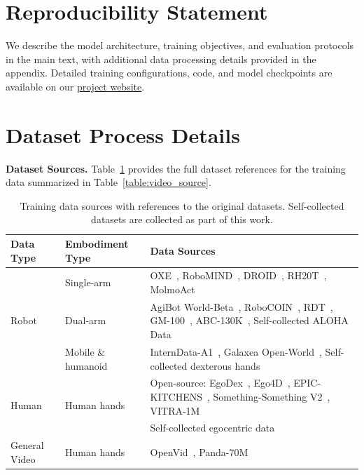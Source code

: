 \section*{Reproducibility Statement}
We describe the model architecture, training objectives, and evaluation protocols in the main text, with additional data processing details provided in the appendix. Detailed training configurations, code, and model checkpoints are available on our \href{https://robert-gyj.github.io/video-prediction-policy-2}{project website}.

\newpage
\appendix

\section{Dataset Process Details}\label{app_data}

\textbf{Dataset Sources.} Table~\ref{table:video_source_full} provides the full dataset references for the training data summarized in Table~\ref{table:video_source}.

\begin{table}[H]
    \centering
    \small
    \setlength{\tabcolsep}{4pt}
    \renewcommand{\arraystretch}{1}
    \begin{tabularx}{\linewidth}{@{}llX@{}}
        \toprule
        Data Type & Embodiment Type & Data Sources \\
        \midrule
        \multirow{3}{*}{Robot}
        & Single-arm
        & OXE~\citep{collaboration2023openx}, RoboMIND~\citep{wu2025robomind}, DROID~\citep{khazatsky2024droid}, RH20T~\citep{fang2024rh20t}, MolmoAct~\citep{lee2025molmoact} \\
        & Dual-arm
        & AgiBot World-Beta~\citep{bu2025agibot}, RoboCOIN~\citep{wu2025robocoin}, RDT~\citep{liu2024rdt}, GM-100~\citep{wang2026gm100}, ABC-130K~\citep{allshire2026abc}, Self-collected ALOHA Data\\
        & Mobile \& humanoid
        & InternData-A1~\citep{tian2025interndata}, Galaxea Open-World~\citep{jiang2025galaxea}, Self-collected dexterous hands \\
        \midrule
        \multirow{2}{*}{Human}
        & \multirow{2}{*}{Human hands}
        & Open-source: EgoDex~\citep{hoque2025egodex}, Ego4D~\citep{grauman2022ego4d}, EPIC-KITCHENS~\citep{damen2018epic}, Something-Something V2~\citep{goyal2017something,mahdisoltani2018granularity}, VITRA-1M~\citep{li2025vitra} \\
        & & Self-collected egocentric data\\
        \midrule
        General Video
        & Human hands
        & OpenVid~\citep{nan2025openvid}, Panda-70M~\citep{chen2024panda} \\
        \bottomrule
    \end{tabularx}
    \caption{Training data sources with references to the original datasets. Self-collected datasets are collected as part of this work.}
    \label{table:video_source_full}
\end{table}

